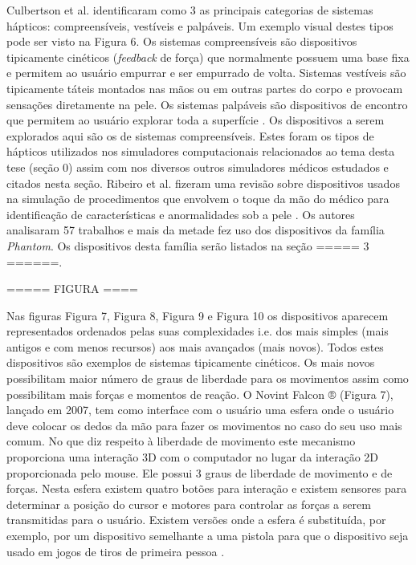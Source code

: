 Culbertson et al. identificaram como 3 as principais categorias de sistemas hápticos: compreensíveis, vestíveis e palpáveis. Um exemplo visual destes tipos pode ser visto na Figura 6. Os sistemas compreensíveis são dispositivos tipicamente cinéticos (\textit{feedback} de força) que normalmente possuem uma base fixa e permitem ao usuário empurrar e ser empurrado de volta. Sistemas vestíveis são tipicamente táteis montados nas mãos ou em outras partes do corpo e provocam sensações diretamente na pele. Os sistemas palpáveis são dispositivos de encontro que permitem ao usuário explorar toda a superfície \cite{Culbertson2018}. Os dispositivos a serem explorados aqui são os de sistemas compreensíveis. Estes foram os tipos de hápticos utilizados nos simuladores computacionais relacionados ao tema desta tese (seção 0) assim com nos diversos outros simuladores médicos estudados e citados nesta seção. Ribeiro et al. fizeram uma revisão sobre dispositivos usados na simulação de procedimentos que envolvem o toque da mão do médico para identificação de características e anormalidades sob a pele \cite{Ribeiro2016}. Os autores analisaram 57 trabalhos e mais da metade fez uso dos dispositivos da família \textit{Phantom}. Os dispositivos desta família serão listados na seção ===== 3 ======.

===== FIGURA ====

Nas figuras Figura 7, Figura 8, Figura 9 e Figura 10 os dispositivos aparecem representados ordenados pelas suas complexidades i.e. dos mais simples (mais antigos e com menos recursos) aos mais avançados (mais novos). Todos estes dispositivos são exemplos de sistemas tipicamente cinéticos. Os mais novos possibilitam maior número de graus de liberdade para os movimentos assim como possibilitam mais forças e momentos de reação. O Novint Falcon ® (Figura 7), lançado em 2007, tem como interface com o usuário uma esfera onde o usuário deve colocar os dedos da mão para fazer os movimentos no caso do seu uso mais comum. No que diz respeito à liberdade de movimento este mecanismo proporciona uma interação 3D com o computador no lugar da interação 2D proporcionada pelo mouse. Ele possui 3 graus de liberdade de movimento e de forças. Nesta esfera existem quatro botões para interação e existem sensores para determinar a posição do cursor e motores para controlar as forças a serem transmitidas para o usuário. Existem versões onde a esfera é substituída, por exemplo, por um dispositivo semelhante a uma pistola para que o dispositivo seja usado em jogos de tiros de primeira pessoa \cite{VRS2017}. 

